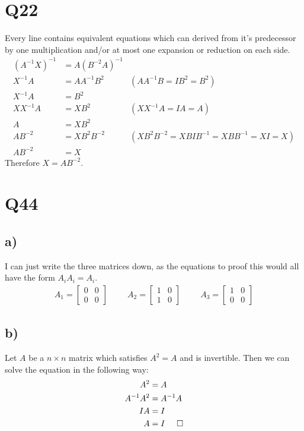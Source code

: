 \documentclass{article}
\begin{document}
\section*{Q22}
Every line contains equivalent equations which can derived from it's predecessor by one multiplication and/or at most one expansion or reduction on each side.
\begin{align*}
    (A^{-1}X)^{-1} &= A(B^{-2}A)^{-1}\\
    X^{-1}A &=AA^{-1}B^2 &(AA^{-1}B=IB^2=B^2)\\
    X^{-1}A &=B^2\\
    XX^{-1}A &=XB^2 &(XX^{-1}A=IA=A)\\
    A &= XB^2\\
    AB^{-2} &= XB^2B^{-2} &(XB^2B^{-2}=XBIB^{-1}=XBB^{-1}=XI=X)\\
    AB^{-2} &= X
\end{align*}
Therefore $X=AB^{-2}$.
\section*{Q44}
\subsection*{a)}
I can just write the three matrices down, as the equations to proof this would all have the form $A_iA_i=A_i$.
\begin{align*}
    A_1 = \begin{bmatrix}
        0 &0\\0&0
    \end{bmatrix}\hspace{1cm}
    A_2 = \begin{bmatrix}
        1 &0\\1&0
    \end{bmatrix}\hspace{1cm}
    A_3 = \begin{bmatrix}
        1 &0\\0&0
    \end{bmatrix}
\end{align*}
\subsection*{b)}
Let $A$ be a $n\times n$ matrix which satisfies $A^2=A$ and is invertible. Then we can solve the equation in the following way:
\begin{align*}
    A^2 &= A\\
    A^{-1}A^2&=A^{-1}A\\
    IA&=I\\
    A&=I\hspace{0.5cm}\square
\end{align*}
\end{document}
